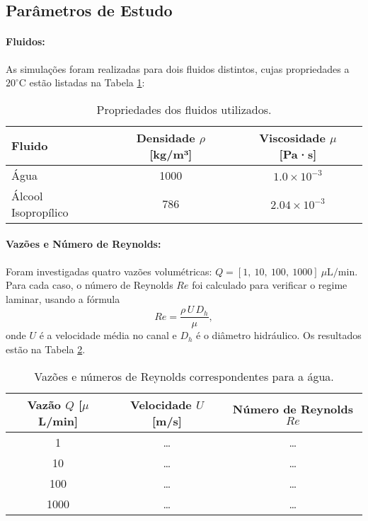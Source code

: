 \documentclass[12pt, a4paper]{article}
\begin{document}
\subsection{Parâmetros de Estudo}

\paragraph{Fluidos:} As simulações foram realizadas para dois fluidos distintos, cujas propriedades a \(20^\circ\mathrm{C}\) estão listadas na Tabela \ref{tab:fluidos}:

\begin{table}[H]
    \centering
    \caption{Propriedades dos fluidos utilizados.}
    \label{tab:fluidos}
    \begin{tabular}{lcc}
        \toprule
        \textbf{Fluido} & \textbf{Densidade \(\rho\) [kg/m³]} & \textbf{Viscosidade \(\mu\) [Pa·s]} \\
        \midrule
        Água & 1000 & \(1.0 \times 10^{-3}\) \\
        Álcool Isopropílico & 786 & \(2.04 \times 10^{-3}\) \\
        \bottomrule
    \end{tabular}
\end{table}

\paragraph{Vazões e Número de Reynolds:} Foram investigadas quatro vazões volumétricas: \(Q = [1,\ 10,\ 100,\ 1000]\ \mu\mathrm{L/min}\).  
Para cada caso, o número de Reynolds \(Re\) foi calculado para verificar o regime laminar, usando a fórmula
\[
Re = \frac{\rho \, U \, D_h}{\mu},
\]
onde \(U\) é a velocidade média no canal e \(D_h\) é o diâmetro hidráulico.  
Os resultados estão na Tabela \ref{tab:reynolds}.

\begin{table}[H]
    \centering
    \caption{Vazões e números de Reynolds correspondentes para a água.}
    \label{tab:reynolds}
    \begin{tabular}{ccc}
        \toprule
        \textbf{Vazão \(Q\) [\(\mu\)L/min]} & \textbf{Velocidade \(U\) [m/s]} & \textbf{Número de Reynolds \(Re\)} \\
        \midrule
        1 & \dots & \dots \\
        10 & \dots & \dots \\
        100 & \dots & \dots \\
        1000 & \dots & \dots \\
        \bottomrule
    \end{tabular}
\end{table}
\end{document}
